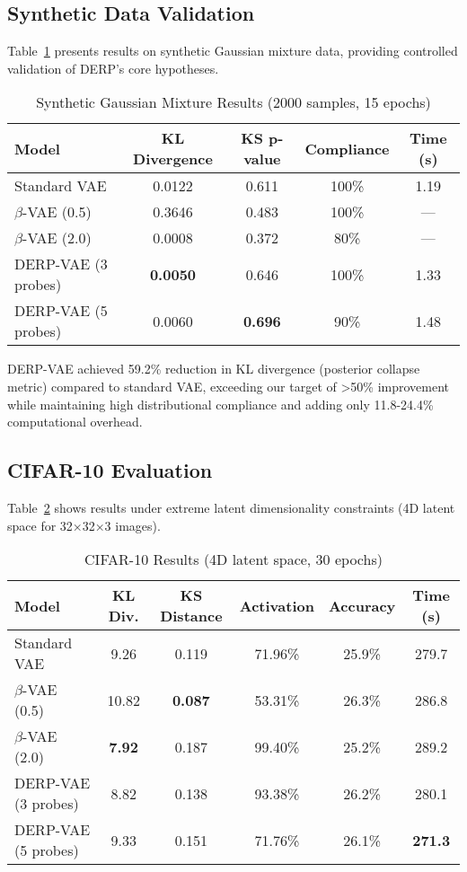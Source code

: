 \documentclass[11pt]{article}
\begin{document}
\subsection{Synthetic Data Validation}

Table~\ref{tab:synthetic_results} presents results on synthetic Gaussian mixture data, providing controlled validation of DERP's core hypotheses.

\begin{table}[ht]
\centering
\caption{Synthetic Gaussian Mixture Results (2000 samples, 15 epochs)}
\label{tab:synthetic_results}
\begin{tabular}{@{}lcccc@{}}
\toprule
\textbf{Model} & \textbf{KL Divergence} & \textbf{KS p-value} & \textbf{Compliance} & \textbf{Time (s)} \\
\midrule
Standard VAE & 0.0122 & 0.611 & 100\% & 1.19 \\
$\beta$-VAE (0.5) & 0.3646 & 0.483 & 100\% & — \\
$\beta$-VAE (2.0) & 0.0008 & 0.372 & 80\% & — \\
DERP-VAE (3 probes) & \textbf{0.0050} & 0.646 & 100\% & 1.33 \\
DERP-VAE (5 probes) & 0.0060 & \textbf{0.696} & 90\% & 1.48 \\
\bottomrule
\end{tabular}
\end{table}

DERP-VAE achieved 59.2\% reduction in KL divergence (posterior collapse metric) compared to standard VAE, exceeding our target of >50\% improvement while maintaining high distributional compliance and adding only 11.8-24.4\% computational overhead.

\subsection{CIFAR-10 Evaluation}

Table~\ref{tab:cifar_results} shows results under extreme latent dimensionality constraints (4D latent space for 32×32×3 images).

\begin{table}[ht]
\centering
\caption{CIFAR-10 Results (4D latent space, 30 epochs)}
\label{tab:cifar_results}
\begin{tabular}{@{}lccccc@{}}
\toprule
\textbf{Model} & \textbf{KL Div.} & \textbf{KS Distance} & \textbf{Activation} & \textbf{Accuracy} & \textbf{Time (s)} \\
\midrule
Standard VAE & 9.26 & 0.119 & 71.96\% & 25.9\% & 279.7 \\
$\beta$-VAE (0.5) & 10.82 & \textbf{0.087} & 53.31\% & 26.3\% & 286.8 \\
$\beta$-VAE (2.0) & \textbf{7.92} & 0.187 & 99.40\% & 25.2\% & 289.2 \\
DERP-VAE (3 probes) & 8.82 & 0.138 & 93.38\% & 26.2\% & 280.1 \\
DERP-VAE (5 probes) & 9.33 & 0.151 & 71.76\% & 26.1\% & \textbf{271.3} \\
\bottomrule
\end{tabular}
\end{table}
\end{document}
